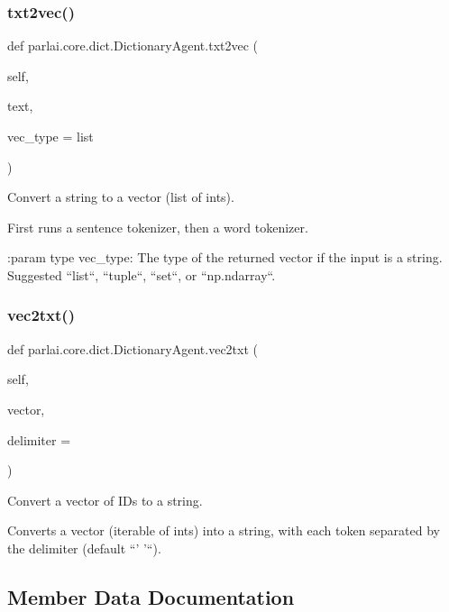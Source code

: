 \subsubsection{\texorpdfstring{txt2vec()}{txt2vec()}}
{\footnotesize\ttfamily def parlai.\+core.\+dict.\+Dictionary\+Agent.\+txt2vec (\begin{DoxyParamCaption}\item[{}]{self,  }\item[{}]{text,  }\item[{}]{vec\+\_\+type = {\ttfamily list} }\end{DoxyParamCaption})}

\begin{DoxyVerb}Convert a string to a vector (list of ints).

First runs a sentence tokenizer, then a word tokenizer.

:param type vec_type:
    The type of the returned vector if the input is a string. Suggested
    ``list``, ``tuple``, ``set``, or ``np.ndarray``.
\end{DoxyVerb}
 \mbox{\label{classparlai_1_1core_1_1dict_1_1DictionaryAgent_af2eeb50b2cd6cf3a8ca817b729ec7486}} 
\subsubsection{\texorpdfstring{vec2txt()}{vec2txt()}}
{\footnotesize\ttfamily def parlai.\+core.\+dict.\+Dictionary\+Agent.\+vec2txt (\begin{DoxyParamCaption}\item[{}]{self,  }\item[{}]{vector,  }\item[{}]{delimiter = {\ttfamily \textquotesingle{}~\textquotesingle{}} }\end{DoxyParamCaption})}

\begin{DoxyVerb}Convert a vector of IDs to a string.

Converts a vector (iterable of ints) into a string, with each token separated by
the delimiter (default ``' '``).
\end{DoxyVerb}
 

\subsection{Member Data Documentation}
\mbox{\label{classparlai_1_1core_1_1dict_1_1DictionaryAgent_af2bfd8d00b4733c085a639521e727ceb}} 
